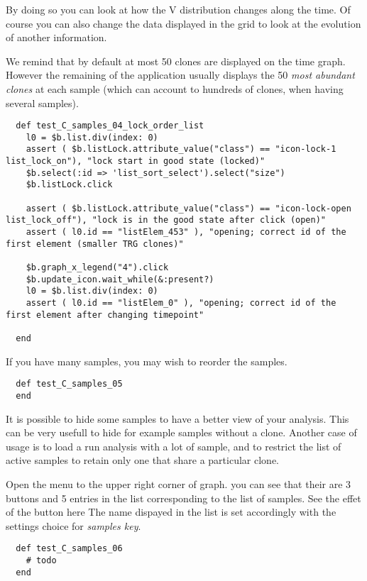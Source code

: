 By doing so you can look at how the V distribution changes along the time.
Of course you can also change the data displayed in the grid to look at
the evolution of another information.

\bigskip

We remind that by default at most 50 clones are displayed
on the time graph. However the remaining of the application usually displays
the 50 \textit{most abundant clones} at each sample (which can account to hundreds of
clones, when having several samples).

\begin{verbatim}
  def test_C_samples_04_lock_order_list
    l0 = $b.list.div(index: 0)
    assert ( $b.listLock.attribute_value("class") == "icon-lock-1 list_lock_on"), "lock start in good state (locked)"
    $b.select(:id => 'list_sort_select').select("size")
    $b.listLock.click

    assert ( $b.listLock.attribute_value("class") == "icon-lock-open list_lock_off"), "lock is in the good state after click (open)"
    assert ( l0.id == "listElem_453" ), "opening; correct id of the first element (smaller TRG clones)"

    $b.graph_x_legend("4").click
    $b.update_icon.wait_while(&:present?)
    l0 = $b.list.div(index: 0)
    assert ( l0.id == "listElem_0" ), "opening; correct id of the first element after changing timepoint"

  end
\end{verbatim}

\bigskip

If you have many samples, you may wish to reorder the samples.

\begin{verbatim}
  def test_C_samples_05
  end
\end{verbatim}

It is possible to hide some samples to have a better view of your analysis. This can be very usefull to hide for example samples without a clone.
Another case of usage is to load a run analysis with a lot of sample, and to restrict the list of active samples to retain only one that share a particular clone.

Open the menu to the upper right corner of graph. you can see that their are 3 buttons and 5 entries in the list corresponding to the list of samples.
See the effet of the button here
The name dispayed in the list is set accordingly with the settings choice for \textit{samples key}.
\begin{verbatim}
  def test_C_samples_06
    # todo
  end
\end{verbatim}


